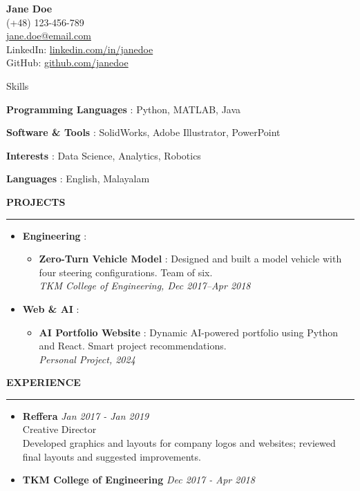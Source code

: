 \documentclass[11pt,letterpaper]{article}
\newcommand{\namesection}[2]{
    \begin{center}
        {\huge \bfseries #1}\\
        \vspace{6pt}
        \small #2
    \end{center}
    \vspace{12pt}
}
\newenvironment{sectionheader}[1]{
    \vspace{10pt}
    \noindent\textbf{\uppercase{#1}}\vspace{2pt}\\
    \hrule height 1pt \vspace{4pt}
    \begin{itemize}[leftmargin=1.2em, itemsep=2pt, topsep=2pt]
}{
    \end{itemize}
}
\newenvironment{sectionheader_nobullet}[1]{
    \vspace{10pt}
    \noindent\textbf{\uppercase{#1}}\vspace{2pt}\\
    \hrule height 1pt \vspace{4pt}
    \begin{itemize}[leftmargin=0em, label={}, itemsep=2pt, topsep=2pt]
}{
    \end{itemize}
}
\begin{document}
\begin{adjustbox}{minipage=\textwidth,scale only axis=true,center,max height=\textheight}
\namesection{Jane Doe}{%
    (+48) 123-456-789 \\
    \href{mailto:jane.doe@email.com}{jane.doe@email.com} \\
    LinkedIn: \href{https://linkedin.com/in/janedoe}{linkedin.com/in/janedoe} \\
    GitHub: \href{https://github.com/janedoe}{github.com/janedoe}
    }
\begin{sectionheader_nobullet}{Skills}
  \item \textbf{ Programming Languages }: Python, MATLAB, Java
  \item \textbf{ Software & Tools }: SolidWorks, Adobe Illustrator, PowerPoint
  \item \textbf{ Interests }: Data Science, Analytics, Robotics
  \item \textbf{ Languages }: English, Malayalam
\end{sectionheader_nobullet}\begin{sectionheader}{Projects}
  \item \textbf{ Engineering }:
  \begin{itemize}[leftmargin=1em]
      \item \textbf{ Zero-Turn Vehicle Model }: Designed and built a model vehicle with four steering configurations. Team of six. \\
        {\small \emph{ TKM College of Engineering, Dec 2017--Apr 2018 }}
  \end{itemize}
  \item \textbf{ Web & AI }:
  \begin{itemize}[leftmargin=1em]
      \item \textbf{ AI Portfolio Website }: Dynamic AI-powered portfolio using Python and React. Smart project recommendations. \\
        {\small \emph{ Personal Project, 2024 }}
  \end{itemize}
\end{sectionheader}\begin{sectionheader}{Experience}
  \item \textbf{ Reffera } \hfill {\emph{ Jan 2017 - Jan 2019 }} \\
    {\small Creative Director} \\
    {\footnotesize Developed graphics and layouts for company logos and websites; reviewed final layouts and suggested improvements.}
  \item \textbf{ TKM College of Engineering } \hfill {\emph{ Dec 2017 - Apr 2018 }} \\

\end{sectionheader}
\end{adjustbox}
\end{document}
